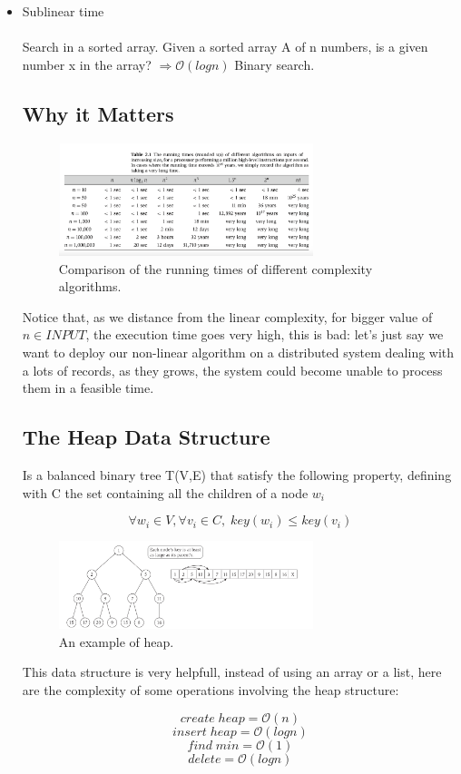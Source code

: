 \documentclass[11pt]{article}
\begin{document}
\begin{itemize}
\item {Sublinear time}\\\\
Search in a sorted array. Given a sorted array A of n numbers, is a given number x in the array? $ \Rightarrow \mathcal{O}{(logn)}$ Binary search.

\subsection{Why it Matters}

\begin{figure}[H]
		\centering
		\includegraphics[width=0.7\textwidth ]{running}
		\caption{Comparison of the running times of different complexity algorithms.}
\end{figure}

Notice that, as we distance from the linear complexity, for bigger value of $n \in INPUT$, the execution time goes very high, this is bad: let's just say we want to deploy our non-linear algorithm on a distributed system dealing with a lots of records, as they grows, the system could become unable to process them in a feasible time.

\subsection{The Heap Data Structure}

Is a balanced binary tree  T(V,E) that satisfy the following property, defining with C the set containing all the children of a node $w_{i}$

\[ \forall w_{i} \in V, \forall v_{i} \in C, \; key(w_{i}) \leq key(v_{i})\]

\begin{figure}[H]
		\centering
		\includegraphics[width=0.7\textwidth ]{heap}
		\caption{An example of heap.}
\end{figure}

This data structure is very helpfull, instead of using an array or a list, here are the complexity of some operations involving the heap structure:

\[ create \; heap =  \mathcal{O}{(n)}\]
\[ insert \; heap =  \mathcal{O}{(logn)}\]
\[find \; min =  \mathcal{O}{(1)}\]
\[delete  =  \mathcal{O}{(logn)}\]

\end{itemize}
\end{document}
